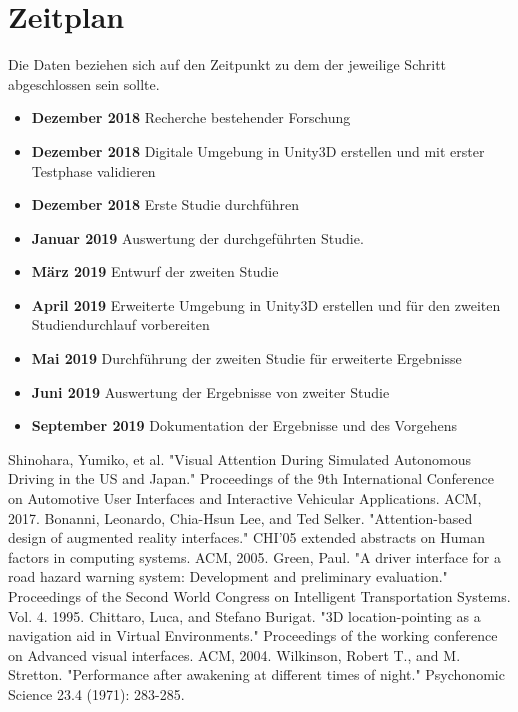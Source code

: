 \documentclass[a4paper, 11pt]{article}
\begin{document}
\section*{Zeitplan}
Die Daten beziehen sich auf den Zeitpunkt zu dem der jeweilige Schritt abgeschlossen sein sollte.
\begin{itemize}
    \item \textbf{Dezember 2018} Recherche bestehender Forschung
    \item \textbf{Dezember 2018} Digitale Umgebung in Unity3D erstellen und mit erster Testphase validieren
    \item \textbf{Dezember 2018} Erste Studie durchführen
    \item \textbf{Januar 2019} Auswertung der durchgeführten Studie.
    \item \textbf{März 2019} Entwurf der zweiten Studie
    \item \textbf{April 2019} Erweiterte Umgebung in Unity3D erstellen und für den zweiten Studiendurchlauf vorbereiten
    \item \textbf{Mai 2019} Durchführung der zweiten Studie für erweiterte Ergebnisse
    \item \textbf{Juni 2019} Auswertung der Ergebnisse von zweiter Studie
    \item \textbf{September 2019} Dokumentation der Ergebnisse und des Vorgehens
\end{itemize}

\begin{thebibliography}{9}
 Shinohara, Yumiko, et al. "Visual Attention During Simulated Autonomous Driving in the US and Japan." Proceedings of the 9th International Conference on Automotive User Interfaces and Interactive Vehicular Applications. ACM, 2017.
 Bonanni, Leonardo, Chia-Hsun Lee, and Ted Selker. "Attention-based design of augmented reality interfaces." CHI'05 extended abstracts on Human factors in computing systems. ACM, 2005.
 Green, Paul. "A driver interface for a road hazard warning system: Development and preliminary evaluation." Proceedings of the Second World Congress on Intelligent Transportation Systems. Vol. 4. 1995.
 Chittaro, Luca, and Stefano Burigat. "3D location-pointing as a navigation aid in Virtual Environments." Proceedings of the working conference on Advanced visual interfaces. ACM, 2004.
 Wilkinson, Robert T., and M. Stretton. "Performance after awakening at different times of night." Psychonomic Science 23.4 (1971): 283-285.
\end{thebibliography}
\end{document}
